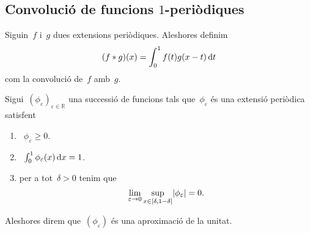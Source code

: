 \documentclass[../../Main.tex]{subfiles}
\begin{document}
	\subsection{Convolució de funcions \ensuremath{1}-periòdiques}
	\begin{definition}
		\label{def:convolució de dues extensions periòdiques}
		Siguin~\(f\) i~\(g\) dues extensions periòdiques.
		Aleshores definim
		\[
		    (f\mathbin{\ast} g)(x)=\int_{0}^{1}f(t)g(x-t)\mathop{}\!\mathrm{d} t
		\]
		com la convolució de~\(f\) amb~\(g\).
	\end{definition}
	\begin{definition}
		\label{def:aproximació de la unitat en extensions periòdiques}
		Sigui~\((\phi_{\varepsilon})_{\varepsilon\in\mathbb{R}}\) una successió de funcions tals que~\(\phi_{\varepsilon}\) és una extensió periòdica satisfent
		\begin{enumerate}
			\item~\(\phi_{\varepsilon}\geq0\).
			\item~\(\int_{0}^{1}\phi_{\varepsilon}(x)\mathop{}\!\mathrm{d} x=1\).
			\item per a tot~\(\delta>0\) tenim que
			\[
			    \lim_{\varepsilon\to0}\sup_{x\in[\delta,1-\delta]}\abs{\phi_{\varepsilon}}=0.
			\]
		\end{enumerate}
		Aleshores direm que~\((\phi_{\varepsilon})\) és una aproximació de la unitat.
	\end{definition}
\end{document}
